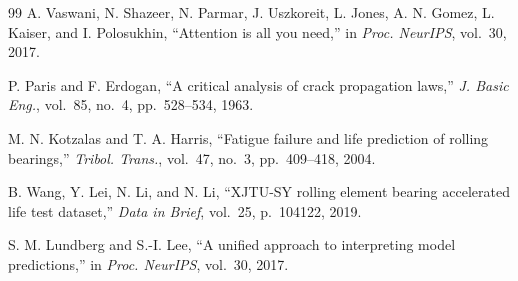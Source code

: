 \documentclass[5p,twocolumn]{elsarticle}
\begin{document}
\begin{thebibliography}{99}
A. Vaswani, N. Shazeer, N. Parmar, J. Uszkoreit, L. Jones, A. N. Gomez, L. Kaiser, and I. Polosukhin,
``Attention is all you need,''
in \textit{Proc. NeurIPS}, vol.~30, 2017.

P. Paris and F. Erdogan,
``A critical analysis of crack propagation laws,''
\textit{J. Basic Eng.}, vol.~85, no.~4, pp.~528--534, 1963.

M. N. Kotzalas and T. A. Harris,
``Fatigue failure and life prediction of rolling bearings,''
\textit{Tribol. Trans.}, vol.~47, no.~3, pp.~409--418, 2004.

B. Wang, Y. Lei, N. Li, and N. Li,
``XJTU-SY rolling element bearing accelerated life test dataset,''
\textit{Data in Brief}, vol.~25, p.~104122, 2019.

S. M. Lundberg and S.-I. Lee,
``A unified approach to interpreting model predictions,''
in \textit{Proc. NeurIPS}, vol.~30, 2017.

\end{thebibliography}
\end{document}
